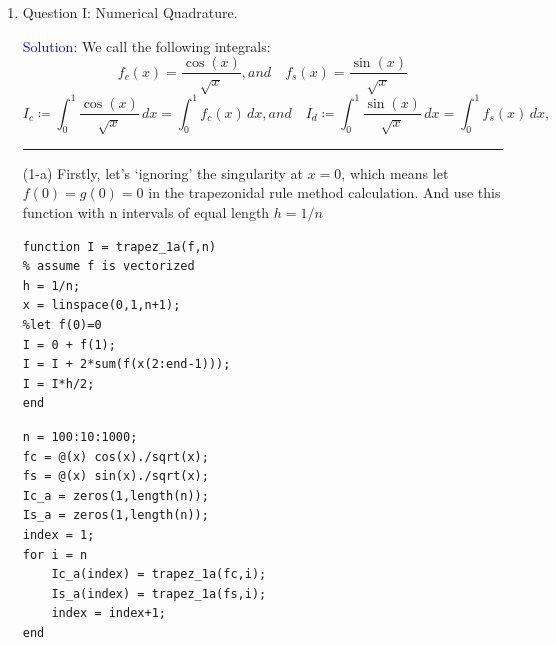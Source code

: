 \documentclass{article}
\begin{document}
\begin{flushleft}
\begin{enumerate}
\item Question I: Numerical Quadrature.
\begin{framed}
\textcolor{blue}{ Solution: }
We call the following integrals:
\[
  f_{c}(x) = \frac{\cos(x)}{\sqrt{x}} ,and \quad f_{s}(x) = \frac{\sin(x)}{\sqrt{x}}
\]
\[
  I_{c} \coloneqq \int_{0}^{1} \frac{\cos(x)}{\sqrt{x}} \,dx = \int_{0}^{1} f_{c}(x) \,dx, and\quad
  I_{d} \coloneqq \int_{0}^{1} \frac{\sin(x)}{\sqrt{x}} \,dx = \int_{0}^{1} f_{s}(x) \,dx,
\]
\rule[-0.7mm]{45em}{0.5pt}
(1-a)
\newline
Firstly, let's `ignoring' the singularity at \(x=0\), which means let \(f(0) = g(0) = 0\) in the trapezonidal rule method calculation. And use this function with n intervals of equal length \(h = 1/n\)

\begin{multicols}{2}
\begin{verbatim}
function I = trapez_1a(f,n)
% assume f is vectorized
h = 1/n;
x = linspace(0,1,n+1);
%let f(0)=0
I = 0 + f(1);
I = I + 2*sum(f(x(2:end-1)));
I = I*h/2;
end
\end{verbatim}
\columnbreak
\begin{verbatim}
n = 100:10:1000;
fc = @(x) cos(x)./sqrt(x);
fs = @(x) sin(x)./sqrt(x);
Ic_a = zeros(1,length(n));
Is_a = zeros(1,length(n));
index = 1;
for i = n
    Ic_a(index) = trapez_1a(fc,i);
    Is_a(index) = trapez_1a(fs,i);
    index = index+1;
end
\end{verbatim}
\end{multicols}




\end{framed}
\end{enumerate}
\end{flushleft}
\end{document}
